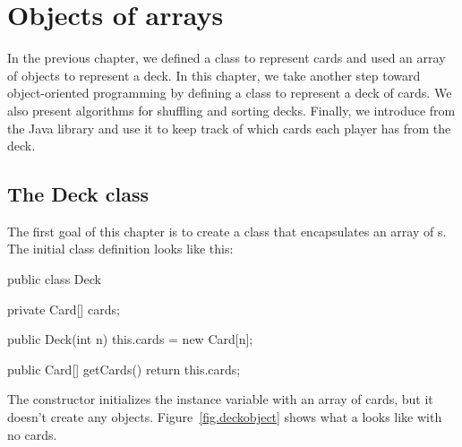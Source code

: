 \chapter{Objects of arrays}


In the previous chapter, we defined a class to represent cards and used an array of  objects to represent a deck.
In this chapter, we take another step toward object-oriented programming by defining a class to represent a deck of cards.
We also present algorithms for shuffling and sorting decks.
Finally, we introduce  from the Java library and use it to keep track of which cards each player has from the deck.





\section{The Deck class}
\label{deck}

The first goal of this chapter is to create a  class that encapsulates an array of s.
The initial class definition looks like this:

\begin{code}
public class Deck {
    private Card[] cards;

    public Deck(int n) {
        this.cards = new Card[n];
    }
    
    public Card[] getCards() {
        return this.cards;
    }
}
\end{code}


The constructor initializes the instance variable with an array of  cards, but it doesn't create any  objects.
Figure~\ref{fig.deckobject} shows what a  looks like with no cards.


